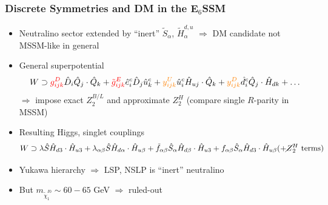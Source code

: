\documentclass[10pt,aspectratio=169]{beamer}
\begin{document}
\begin{frame}
  \frametitle{Discrete Symmetries and DM in the E$_6$SSM}
  \begin{itemize}\itemsep0.8em
  \item Neutralino sector extended by ``inert'' $\tilde{S}_\alpha$,
    $\tilde{H}^{d,u}_{\alpha}$ $\Rightarrow$ DM candidate not MSSM-like in
    general
  \item General superpotential
    \begin{equation*}
      W \supset {\color{red} g_{ijk}^D} \hat{D}_i \hat{Q}_j \cdot \hat{Q}_k
      + {\color{red} \tilde{g}_{ijk}^E} \hat{e}_i^c \hat{D}_j \hat{u}_k^c
      + {\color{orange} y_{ijk}^U} \hat{u}_i^c \hat{H}_{uj} \cdot \hat{Q}_k
      + {\color{orange} y_{ijk}^D} \hat{d}_i^c \hat{Q}_j \cdot
      \hat{H}_{dk} + \ldots
    \end{equation*}
    $\Rightarrow$ impose {\color{red} exact $Z_2^{B/L}$} and {\color{orange}
      approximate $Z_2^H$} (compare single $R$-parity in MSSM)
    \item Resulting Higgs, singlet couplings
      \begin{equation*}
        W \supset \lambda \hat{S} \hat{H}_{d3} \cdot \hat{H}_{u3}
        + \lambda_{\alpha\beta} \hat{S} \hat{H}_{d\alpha} \cdot
        \hat{H}_{u\beta} + \tilde{f}_{\alpha\beta} \hat{S}_\alpha
        \hat{H}_{d\beta} \cdot \hat{H}_{u3} + f_{\alpha\beta}
        \hat{S}_\alpha \hat{H}_{d3} \cdot \hat{H}_{u\beta}
        (+ \cancel{Z}_2^H \text{ terms})
      \end{equation*}
    \item Yukawa hierarchy $\Rightarrow$ LSP, NSLP is ``inert'' neutralino
    \item \alert{But $m_{\tilde{\chi}_1^{I0}} \sim 60 - 65$ GeV $\Rightarrow$
      ruled-out}
  \end{itemize}
\end{frame}
\end{document}
